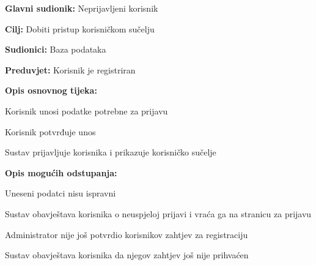 					\noindent {}
					\begin{packed_item}
						
						\item \textbf{Glavni sudionik:} Neprijavljeni korisnik
						\item  \textbf{Cilj:} Dobiti pristup korisničkom sučelju
						\item  \textbf{Sudionici:} Baza podataka
						\item  \textbf{Preduvjet:} Korisnik je registriran
						\item  \textbf{Opis osnovnog tijeka:}
						
						\item[] \begin{packed_enum}
							
							\item Korisnik unosi podatke potrebne za prijavu
							\item Korisnik potvrđuje unos
							\item Sustav prijavljuje korisnika i prikazuje korisničko sučelje
						\end{packed_enum}
						
						\item  \textbf{Opis mogućih odstupanja:}
						
						\item[] \begin{packed_item}
							
							\item[2.a] Uneseni podatci nisu ispravni
							\item[] \begin{packed_enum}
								
								\item Sustav obavještava korisnika o neuspjeloj prijavi i vraća ga na stranicu za prijavu
								
							\end{packed_enum}
						
							\item[3.a] Administrator nije još potvrdio korisnikov zahtjev za registraciju
							\item[] \begin{packed_enum}
								
								\item Sustav obavještava korisnika da njegov zahtjev još nije prihvaćen
								
							\end{packed_enum}
							
						\end{packed_item}
					\end{packed_item}
				
